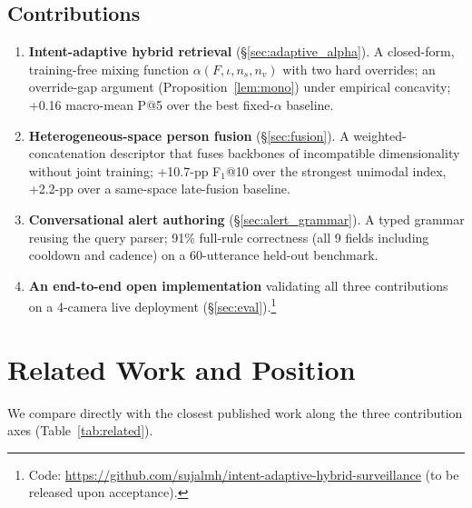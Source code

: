 ﻿\documentclass[conference]{IEEEtran}
\theoremstyle{definition}
\begin{document}
\subsection*{Contributions}
\begin{enumerate}
\item \textbf{Intent-adaptive hybrid retrieval} (\S\ref{sec:adaptive_alpha}). A closed-form, training-free mixing function $\alpha(F,\iota,n_s,n_v)$ with two hard overrides; an override-gap argument (Proposition~\ref{lem:mono}) under empirical concavity; +0.16 macro-mean P@5 over the best fixed-$\alpha$ baseline.
\item \textbf{Heterogeneous-space person fusion} (\S\ref{sec:fusion}). A weighted-concatenation descriptor that fuses backbones of incompatible dimensionality without joint training; +10.7-pp F$_1$@10 over the strongest unimodal index, +2.2-pp over a same-space late-fusion baseline.
\item \textbf{Conversational alert authoring} (\S\ref{sec:alert_grammar}). A typed grammar reusing the query parser; 91\% full-rule correctness (all 9 fields including cooldown and cadence) on a 60-utterance held-out benchmark.
\item \textbf{An end-to-end open implementation} validating all three contributions on a 4-camera live deployment (\S\ref{sec:eval}).\footnote{Code: \url{https://github.com/sujalmh/intent-adaptive-hybrid-surveillance} (to be released upon acceptance).}
\end{enumerate}

\section{Related Work and Position}

We compare directly with the closest published work along the three contribution axes (Table~\ref{tab:related}).
\end{document}

